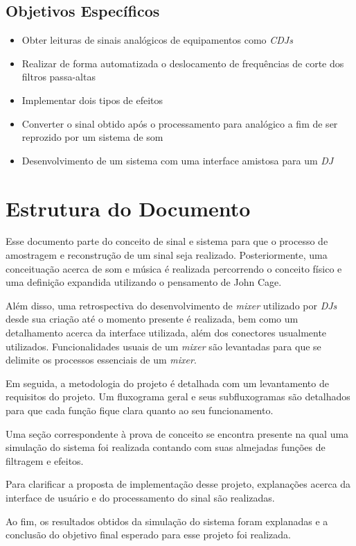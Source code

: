 \subsection{Objetivos Específicos}
\begin{itemize}
    \item Obter leituras de sinais analógicos de equipamentos como \textit{CDJs}
    \item Realizar de forma automatizada o deslocamento de frequências de corte dos filtros passa-altas
    \item Implementar dois tipos de efeitos
    \item Converter o sinal obtido após o processamento para analógico a fim de ser reprozido por um sistema de som
    \item Desenvolvimento de um sistema com uma interface amistosa para um \textit{DJ}
\end{itemize}

\section{Estrutura do Documento}

Esse documento parte do conceito de sinal e sistema para que o processo de amostragem e reconstrução de um sinal seja realizado. Posteriormente, uma conceituação acerca de som e música é realizada percorrendo o conceito físico e uma definição expandida utilizando o pensamento de John Cage. 

Além disso, uma retrospectiva do desenvolvimento de \textit{mixer} utilizado por \textit{DJs} desde sua criação até o momento presente é realizada, bem como um detalhamento acerca da interface utilizada, além dos conectores usualmente utilizados. Funcionalidades usuais de um \textit{mixer} são levantadas para que se delimite os processos essenciais de um \textit{mixer}.

Em seguida, a metodologia do projeto é detalhada com um levantamento de requisitos do projeto. Um fluxograma geral e seus subfluxogramas são detalhados para que cada função fique clara quanto ao seu funcionamento. 

Uma seção correspondente à prova de conceito se encontra presente na qual uma simulação do sistema foi realizada contando com suas almejadas funções de filtragem e efeitos. 

Para clarificar a proposta de implementação desse projeto, explanações acerca da interface de usuário e do processamento do sinal são realizadas.

Ao fim, os resultados obtidos da simulação do sistema foram explanadas e a conclusão do objetivo final esperado para esse projeto foi realizada.